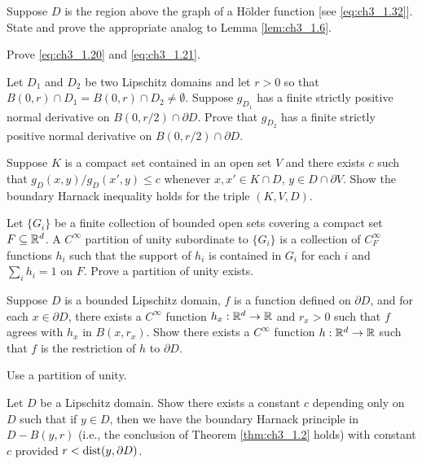 \begin{exercise}\label{ex:ch3_3}
Suppose $D$ is the region above the graph of a H\"older function [see \eqref{eq:ch3_1.32}]. State and prove the appropriate analog to Lemma \ref{lem:ch3_1.6}.
\end{exercise}

\begin{exercise}\label{ex:ch3_4}
Prove \eqref{eq:ch3_1.20} and \eqref{eq:ch3_1.21}.
\end{exercise}

\begin{exercise}\label{ex:ch3_5}
Let $D_1$ and $D_2$ be two Lipschitz domains and let $r > 0$ so that $B(0,r) \cap D_1 = B(0,r) \cap D_2 \neq \emptyset$. Suppose $g_{D_1}$ has a finite strictly positive normal derivative on $B(0,r/2) \cap \partial D$. Prove that $g_{D_2}$ has a finite strictly positive normal derivative on $B(0,r/2) \cap \partial D$.
\end{exercise}

\begin{exercise}\label{ex:ch3_6}
Suppose $K$ is a compact set contained in an open set $V$ and there exists $c$ such that $g_D(x,y)/g_D(x',y) \leq c$ whenever $x,x' \in K \cap D$, $y \in D \cap \partial V$. Show the boundary Harnack inequality holds for the triple $(K,V,D)$.
\end{exercise}

\begin{exercise}\label{ex:ch3_7}
Let $\{G_i\}$ be a finite collection of bounded open sets covering a compact set $F \subseteq \mathbb{R}^d$. A $C^\infty$ partition of unity subordinate to $\{G_i\}$ is a collection of $C_F^\infty$ functions $h_i$ such that the support of $h_i$ is contained in $G_i$ for each $i$ and $\sum_i h_i = 1$ on $F$. Prove a partition of unity exists.
\end{exercise}

\begin{exercise}\label{ex:ch3_8}
Suppose $D$ is a bounded Lipschitz domain, $f$ is a function defined on $\partial D$, and for each $x \in \partial D$, there exists a $C^\infty$ function $h_x : \mathbb{R}^d \to \mathbb{R}$ and $r_x > 0$ such that $f$ agrees with $h_x$ in $B(x,r_x)$. Show there exists a $C^\infty$ function $h : \mathbb{R}^d \to \mathbb{R}$ such that $f$ is the restriction of $h$ to $\partial D$.

\hint Use a partition of unity.
\end{exercise}

\begin{exercise}\label{ex:ch3_9}
Let $D$ be a Lipschitz domain. Show there exists a constant $c$ depending only on $D$ such that if $y \in D$, then we have the boundary Harnack principle in $D - B(y,r)$ (i.e., the conclusion of Theorem \ref{thm:ch3_1.2} holds) with constant $c$ provided $r < \operatorname{dist}(y,\partial D)$.
\end{exercise}

